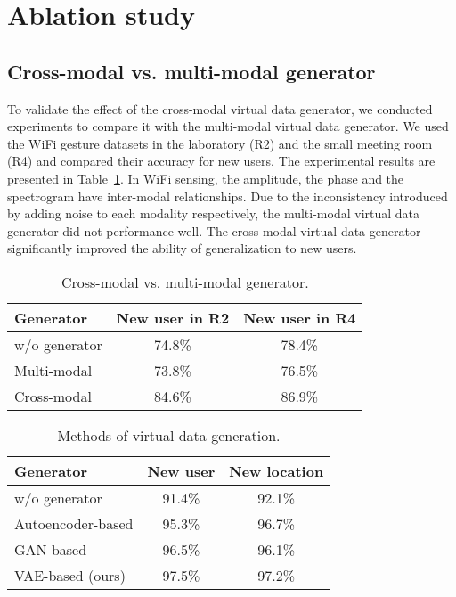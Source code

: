 \documentclass[journal]{IEEEtran}
\begin{document}
\section{Ablation study}
\label{SecAblationStudy}

\subsection{Cross-modal vs. multi-modal generator}
To validate the effect of the cross-modal virtual data generator, we conducted experiments to compare it with the multi-modal virtual data generator. We used the WiFi gesture datasets in the laboratory (R2) and the small meeting room (R4) and compared their accuracy for new users. The experimental results are presented in Table~\ref{TblVirtualDataGeneration}. In WiFi sensing, the amplitude, the phase and the spectrogram have inter-modal relationships. Due to the inconsistency introduced by adding noise to each modality respectively, the multi-modal virtual data generator did not performance well. The cross-modal virtual data generator significantly improved the ability of generalization to new users. 

\begin{table}[h]
		\footnotesize
    \centering
		\caption{Cross-modal vs. multi-modal generator.}
		\label{TblVirtualDataGeneration}
    \begin{tabular}{p{2cm}cc}
    \hline
		Generator				& New user in R2 		& New user in R4 	\\  \hline
    w/o generator 	& 74.8\% 						& 78.4\% 					\\ 
		Multi-modal  		& 73.8\%						& 76.5\%					\\
    Cross-modal  		& 84.6\% 						& 86.9\% 					\\ \hline  
		\end{tabular}
\end{table}

\begin{table}[h]
		\footnotesize
    \centering
		\caption{Methods of virtual data generation.}
		\label{TblGenerationMethod}
    \begin{tabular}{p{3cm}cc}
    \hline
		Generator							& New user	& New location		\\ \hline
    w/o generator 				& 91.4\% 			& 92.1\% 			\\ 
    Autoencoder-based 		& 95.3\% 			& 96.7\% 			\\ 
    GAN-based 						& 96.5\%			& 96.1\% 			\\ 
    VAE-based (ours)			& 97.5\% 			& 97.2\% 			\\ \hline
    \end{tabular}
\end{table}
\end{document}
